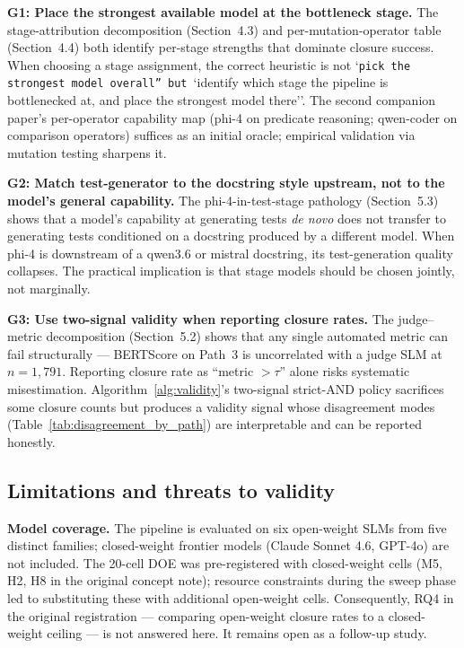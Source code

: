 \textbf{G1: Place the strongest available model at the bottleneck stage.} The stage-attribution decomposition (Section~4.3) and per-mutation-operator table (Section~4.4) both identify per-stage strengths that dominate closure success. When choosing a stage assignment, the correct heuristic is not `\texttt{pick the strongest model overall'' but }`identify which stage the pipeline is bottlenecked at, and place the strongest model there''. The second companion paper's per-operator capability map (phi-4 on predicate reasoning; qwen-coder on comparison operators) suffices as an initial oracle; empirical validation via mutation testing sharpens it.

\textbf{G2: Match test-generator to the docstring style upstream, not to the model's general capability.} The phi-4-in-test-stage pathology (Section~5.3) shows that a model's capability at generating tests \emph{de novo} does not transfer to generating tests conditioned on a docstring produced by a different model. When phi-4 is downstream of a qwen3.6 or mistral docstring, its test-generation quality collapses. The practical implication is that stage models should be chosen jointly, not marginally.

\textbf{G3: Use two-signal validity when reporting closure rates.} The judge--metric decomposition (Section~5.2) shows that any single automated metric can fail structurally --- BERTScore on Path~3 is uncorrelated with a judge SLM at $n = 1{,}791$. Reporting closure rate as ``metric $> \tau$'' alone risks systematic misestimation. Algorithm~\ref{alg:validity}'s two-signal strict-AND policy sacrifices some closure counts but produces a validity signal whose disagreement modes (Table~\ref{tab:disagreement_by_path}) are interpretable and can be reported honestly.

\subsection{Limitations and threats to validity}

\textbf{Model coverage.} The pipeline is evaluated on six open-weight SLMs from five distinct families; closed-weight frontier models (Claude Sonnet 4.6, GPT-4o) are not included. The 20-cell DOE was pre-registered with closed-weight cells (M5, H2, H8 in the original concept note); resource constraints during the sweep phase led to substituting these with additional open-weight cells. Consequently, RQ4 in the original registration --- comparing open-weight closure rates to a closed-weight ceiling --- is not answered here. It remains open as a follow-up study.

